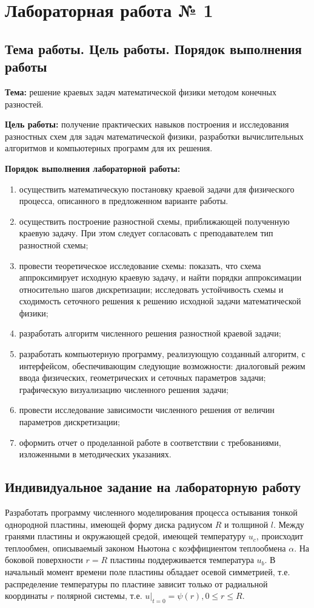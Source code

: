 \documentclass[a4paper,14pt,russian, leqno, fleqn]{extreport}
\begin{document}
	
	\tableofcontents
	
	\chapter{Лабораторная работа № 1}
	\section{Тема работы. Цель работы. Порядок выполнения работы}
	\textbf{Тема:} решение краевых задач математической физики методом конечных разностей.
	
	\textbf{Цель работы:} получение практических навыков построения и исследования разностных схем для задач математической физики, разработки вычислительных алгоритмов и компьютерных программ для их решения.
	
	\textbf{Порядок выполнения лабораторной работы:}
	\begin{enumerate}
		\item осуществить математическую постановку краевой задачи для физического процесса, описанного в предложенном варианте работы.
		\item осуществить построение разностной схемы, приближающей полученную краевую задачу. При этом следует согласовать с преподавателем тип разностной схемы;
		\item провести теоретическое исследование схемы: показать, что схема аппроксимирует исходную краевую задачу, и найти порядки аппроксимации относительно шагов дискретизации; исследовать устойчивость схемы и сходимость сеточного решения к решению исходной задачи математической физики;
		\item разработать алгоритм численного решения разностной краевой задачи;
		\item разработать компьютерную программу, реализующую созданный алгоритм, с интерфейсом, обеспечивающим следующие возможности: диалоговый режим ввода физических, геометрических и сеточных параметров задачи; графическую визуализацию численного решения задачи;
		\item провести исследование зависимости численного решения от величин параметров дискретизации;
		\item оформить отчет о проделанной работе в соответствии с требованиями, изложенными в методических указаниях.
	\end{enumerate}
	
	\section{Индивидуальное задание на лабораторную работу}	
	Разработать программу численного моделирования процесса остывания тонкой однородной пластины, имеющей форму диска радиусом $R$ и толщиной $l$. Между гранями пластины и окружающей средой, имеющей температуру $u_c$, происходит теплообмен, описываемый законом Ньютона с коэффициентом теплообмена $\alpha$.  На боковой поверхности $r=R$ пластины поддерживается температура $u_b$. В начальный момент времени поле пластины обладает осевой симметрией, т.е. распределение температуры по пластине зависит только от радиальной координаты $r$ полярной системы, т.е. $u\lvert_{t=0} = \psi(r), 0 \leq r \leq R$.
	
\end{document}
